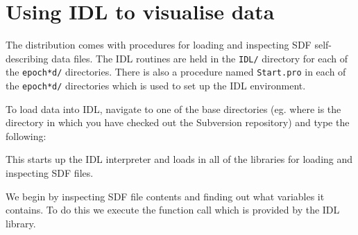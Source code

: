 \section{Using IDL to visualise data}

  The {\EPOCH} distribution comes with procedures for loading and inspecting
  SDF self-describing data files.
  The IDL routines are held in the {\tt IDL/} directory
  for each of the {\tt epoch*d/} directories. There is also a procedure
  named {\tt Start.pro} in each of the {\tt epoch*d/} directories which is
  used to set up the IDL environment.

  To load data into IDL, navigate to one of the base directories (eg.
   where  is the directory in which you
  have checked out the Subversion repository) and type
  the following:


  This starts up the IDL interpreter and loads in all of the libraries
  for loading and inspecting SDF files.

  We begin by inspecting SDF file contents and finding out what variables
  it contains. To do this we execute the  function call
  which is provided by the {\EPOCH} IDL library.

